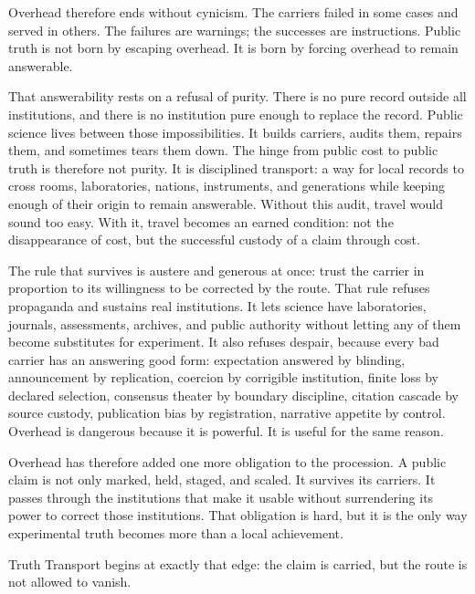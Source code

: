 \begin{movementclose}
Overhead therefore ends without cynicism. The carriers failed in some cases
and served in others. The failures are warnings; the successes are
instructions. Public truth is not born by escaping overhead. It is born by
forcing overhead to remain answerable.

That answerability rests on a refusal of purity. There is no pure record
outside all institutions, and there is no institution pure enough to
replace the record. Public science lives between those impossibilities. It
builds carriers, audits them, repairs them, and sometimes tears them down.
The hinge from public cost to public truth is therefore not purity. It is
disciplined transport: a way for local records to cross rooms,
laboratories, nations, instruments, and generations while keeping enough of
their origin to remain answerable. Without this audit, travel would sound
too easy. With it, travel becomes an earned condition: not the
disappearance of cost, but the successful custody of a claim through cost.

The rule that survives is austere and generous at once: trust the carrier
in proportion to its willingness to be corrected by the route. That rule
refuses propaganda and sustains real institutions. It lets science have
laboratories, journals, assessments, archives, and public authority without
letting any of them become substitutes for experiment. It also refuses
despair, because every bad carrier has an answering good form: expectation
answered by blinding, announcement by replication, coercion by corrigible
institution, finite loss by declared selection, consensus theater by
boundary discipline, citation cascade by source custody, publication bias
by registration, narrative appetite by control. Overhead is dangerous
because it is powerful. It is useful for the same reason.

Overhead has therefore added one more obligation to the procession. A
public claim is not only marked, held, staged, and scaled. It survives its
carriers. It passes through the institutions that make it usable without
surrendering its power to correct those institutions. That obligation is
hard, but it is the only way experimental truth becomes more than a local
achievement.

Truth Transport begins at exactly that edge: the claim is carried, but the
route is not allowed to vanish.
\end{movementclose}
